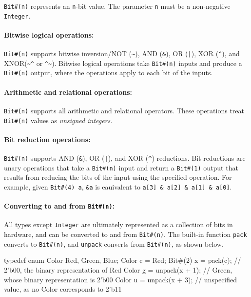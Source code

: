 \verb|Bit#(n)| represents an \verb|n|-bit value.
The parameter \verb|n| must be a non-negative \verb|Integer|.

\paragraph{Bitwise logical operations:}
\verb|Bit#(n)| supports bitwise inversion/NOT (\verb|~|), AND (\verb|&|), OR (\texttt{|}), XOR (\verb|^|), and XNOR(\verb|~^| or \verb|^~|).
Bitwise logical operations take \verb|Bit#(n)| inputs and produce a \verb|Bit#(n)| output, where the operations apply to each bit of the inputs.

\paragraph{Arithmetic and relational operations:}
\verb|Bit#(n)| supports all arithmetic and relational operators.
These operations treat \verb|Bit#(n)| values as \emph{unsigned integers}.

\paragraph{Bit reduction operations:}
\verb|Bit#(n)| supports AND (\verb|&|), OR (\texttt{|}), and XOR (\verb|^|) reductions.
Bit reductions are unary operations that take a \verb|Bit#(n)| input
and return a \verb|Bit#(1)| output that results
from reducing the bits of the input using the specified operation.
For example, given \verb|Bit#(4) a|, \verb|&a| is eauivalent to \verb|a[3] & a[2] & a[1] & a[0]|.

\paragraph{Converting to and from \texttt{Bit\#(n)}:}
All types except \texttt{Integer} are ultimately represented as a collection of bits in hardware, and can be converted to and from \texttt{Bit\#(n)}.
The built-in function \verb|pack| converts to \verb|Bit#(n)|,
and \verb|unpack| converts from \verb|Bit#(n)|, as shown below.

\begin{mscode}
typedef enum Color {Red, Green, Blue};
Color c = Red;
Bit#(2) x = pack(c);      // 2'b00, the binary representation of Red
Color g = unpack(x + 1);  // Green, whose binary representation is 2'b00
Color u = unpack(x + 3);  // unspecified value, as no Color corresponds to 2'b11
\end{mscode}

